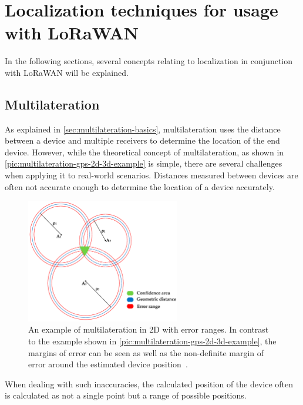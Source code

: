 \section{Localization techniques for usage with \acs{LoRaWAN}}\label{sec:lorawan-localization-techniques}

In the following sections, several concepts relating to localization in conjunction with \ac{LoRaWAN} will be explained.

\subsection{Multilateration}\label{sec:lorawan-multilateration}

As explained in \cref{sec:multilateration-basics}, multilateration uses the distance between a device and multiple receivers to determine the location of the end device.
However, while the theoretical concept of multilateration, as shown in \cref{pic:multilateration-gps-2d-3d-example} is simple, there are several challenges when applying it to real-world scenarios.
Distances measured between devices are often not accurate enough to determine the location of a device accurately.

\begin{figure}[htbp]
    \centering
    \includegraphics[width=0.6\textwidth]{pictures/multilateration/multilateration_error_ranges.png}
    \caption{
        An example of multilateration in 2D with error ranges.
        In contrast to the example shown in \cref{pic:multilateration-gps-2d-3d-example}, the margins of error can be seen as well as the non-definite margin of error around the estimated device position~\protect\cite{kapoor_novel_2016}.
    }\label{pic:multilateration-with-error-ranges-example}
\end{figure}

When dealing with such inaccuracies, the calculated position of the device often is calculated as not a single point but a range of possible positions.

